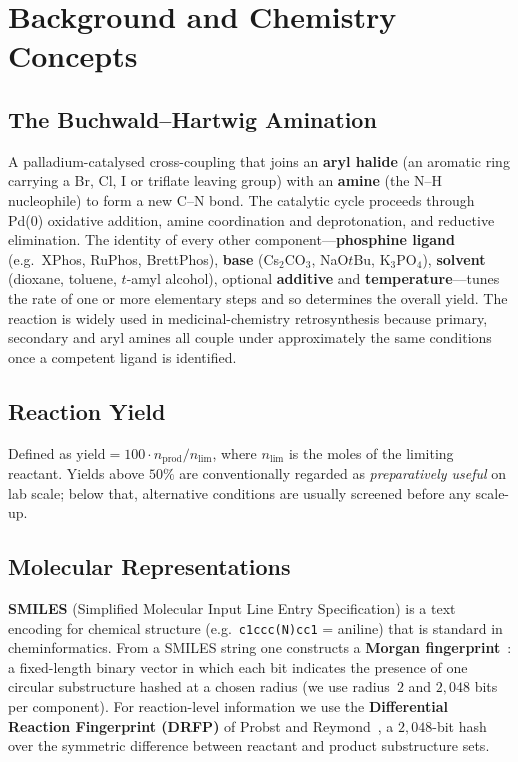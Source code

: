 \documentclass[conference]{IEEEtran}
\begin{document}
\section{Background and Chemistry Concepts}
\label{sec:background}

\subsection{The Buchwald--Hartwig Amination}
A palladium-catalysed cross-coupling that joins an \textbf{aryl halide}
(an aromatic ring carrying a Br, Cl, I or triflate leaving group) with an
\textbf{amine} (the N--H nucleophile) to form a new C--N bond. The catalytic
cycle proceeds through Pd(0) oxidative addition, amine coordination and
deprotonation, and reductive elimination. The identity of every other
component---\textbf{phosphine ligand} (e.g.\ XPhos, RuPhos, BrettPhos),
\textbf{base} (Cs$_{2}$CO$_{3}$, NaO$t$Bu, K$_{3}$PO$_{4}$),
\textbf{solvent} (dioxane, toluene, $t$-amyl alcohol), optional
\textbf{additive} and \textbf{temperature}---tunes the rate of one or more
elementary steps and so determines the overall yield. The reaction is widely
used in medicinal-chemistry retrosynthesis because primary, secondary and
aryl amines all couple under approximately the same conditions once a
competent ligand is identified.

\subsection{Reaction Yield}
Defined as
$\mathrm{yield} = 100 \cdot n_{\mathrm{prod}} / n_{\mathrm{lim}}$, where
$n_{\mathrm{lim}}$ is the moles of the limiting reactant. Yields above
$50\%$ are conventionally regarded as \emph{preparatively useful} on lab
scale; below that, alternative conditions are usually screened before any
scale-up.

\subsection{Molecular Representations}
\textbf{SMILES} (Simplified Molecular Input Line Entry Specification) is a
text encoding for chemical structure (e.g.\ \texttt{c1ccc(N)cc1} = aniline)
that is standard in cheminformatics. From a SMILES string one constructs
a \textbf{Morgan fingerprint}~\cite{Rogers2010}: a fixed-length binary
vector in which each bit indicates the presence of one circular substructure
hashed at a chosen radius (we use radius~$2$ and $2{,}048$ bits per
component). For reaction-level information we use the \textbf{Differential
Reaction Fingerprint (DRFP)} of Probst and Reymond~\cite{Probst2022}, a
$2{,}048$-bit hash over the symmetric difference between reactant and
product substructure sets.
\end{document}

